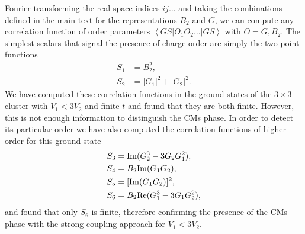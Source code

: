 \documentclass[aps,prx,10pt,twocolumn,floatfix,superscriptaddress,showpacs,numerical,footinbib]{revtex4-1}
\begin{document}
%
Fourier transforming the real space indices $ij\ldots$ and taking the combinations defined in the main text for the representations $B_2$ and $G$, we can compute any correlation function of order parameters $\left< GS \right| O_1 O_2 \ldots \left| GS \right> $ with $O = G, B_2$. 
%
The simplest scalars that signal the presence of charge order are simply the two point functions
\begin{align}
S_1 &= B_2^2, \\
S_2 &= |G_1|^2+|G_2|^2.
\end{align}
We have computed these correlation functions in the ground states of the $3\times3$ cluster with $V_1<3V_2$ and finite $t$ and found that they are both finite. 
%
However, this is not enough information to distinguish the CMs phase. 
%
In order to detect its particular order we have also computed the correlation functions of higher order for this ground state
%
\begin{align}
S_3 &= {\rm Im}(G_2^3-3G_2 G_1^2),  \\
S_4 &= B_2 {\rm Im}(G_1G_2), \\
S_5 &= [{\rm Im}(G_1G_2)]^2, \\
S_6 &= B_2{\rm Re}(G_1^3-3G_1 G_2^2),
\end{align}
%
and found that only $S_6$ is finite, therefore confirming the presence of the CMs phase with the strong coupling approach for $V_1<3V_2$. 


\end{document}
